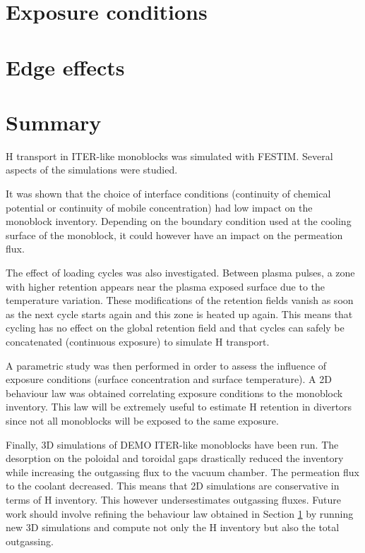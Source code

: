\section{Exposure conditions} \label{influence of exposure conditions}


\section{Edge effects} \label{3D edge effects}


\section{Summary}
H transport in ITER-like monoblocks was simulated with FESTIM.
Several aspects of the simulations were studied.

It was shown that the choice of interface conditions (continuity of chemical potential or continuity of mobile concentration) had low impact on the monoblock inventory.
Depending on the boundary condition used at the cooling surface of the monoblock, it could however have an impact on the permeation flux.

The effect of loading cycles was also investigated.
Between plasma pulses, a zone with higher retention appears near the plasma exposed surface due to the temperature variation.
These modifications of the retention fields vanish as soon as the next cycle starts again and this zone is heated up again.
This means that cycling has no effect on the global retention field and that cycles can safely be concatenated (continuous exposure) to simulate H transport.

A parametric study was then performed in order to assess the influence of exposure conditions (surface concentration and surface temperature).
A 2D behaviour law was obtained correlating exposure conditions to the monoblock inventory.
This law will be extremely useful to estimate H retention in divertors since not all monoblocks will be exposed to the same exposure.

Finally, 3D simulations of DEMO ITER-like monoblocks have been run.
The desorption on the poloidal and toroidal gaps drastically reduced the inventory while increasing the outgassing flux to the vacuum chamber.
The permeation flux to the coolant decreased.
This means that 2D simulations are conservative in terms of H inventory.
This however undersestimates outgassing fluxes.
Future work should involve refining the behaviour law obtained in Section \ref{influence of exposure conditions} by running new 3D simulations and compute not only the H inventory but also the total outgassing.

